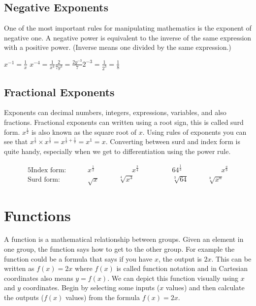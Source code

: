 \subsection*{Negative Exponents}
One of the most important rules for manipulating mathematics is the exponent of negative one. A negative power is equivalent to the inverse of the same expression with a positive power. (Inverse means one divided by the same expression.)\\

\begin{tcolorbox}
	\hspace{1cm}$x^{-1}=\frac{1}{x}$ \hspace{2cm}$x^{-4}=\frac{1}{x^4}$\hspace{2cm}$\frac{2}{7y^3}=\frac{2y^{-3}}{7} $\hspace{2cm}$2^{-3}=\frac{1}{2^3}=\frac{1}{8} $
\end{tcolorbox}	

\subsection*{Fractional Exponents}
Exponents can decimal numbers, integers, expressions, variables, and also fractions. Fractional exponents can written using a root sign, this is called surd form. $x^{\frac{1}{2}}$ is also known as the square root of $x$. Using rules of exponents you can see that $x^{\frac{1}{2}}\times x^{\frac{1}{2}}=x^{\frac{1}{2}+\frac{1}{2}}=x^1=x$. Converting between surd and index form is quite handy, especially when we get to differentiation using the power rule.
\begin{tcolorbox}\begin{alignat*}{5}
\textrm{Index form: }\qquad&x^{\frac{1}{2}}&\qquad\qquad x^{\frac{3}{4}} &\qquad\qquad 64^{\frac{1}{3}}&\qquad\qquad x^\frac{a}{b}\\
\textrm{Surd form: }\qquad&\sqrt{x}&\qquad \sqrt[4]{x^3}&\qquad\qquad\sqrt[3]{64}&\qquad \sqrt[b]{x^a}
\end{alignat*}\end{tcolorbox}
	
\section{Functions}	
A function is a mathematical relationship between groups. Given an element in one group, the function says how to get to the other group. For example the function could be a formula that says if you have $x$, the output is $2x$. This can be written as $f(x)=2x$ where $f(x)$ is called function notation and in Cartesian coordinates also means $y=f(x)$. We can depict this function visually using $x$ and $y$ coordinates. Begin by selecting some inputs ($x$ values) and then calculate the outputs ($f(x)$ values) from the formula $f(x)=2x$.

